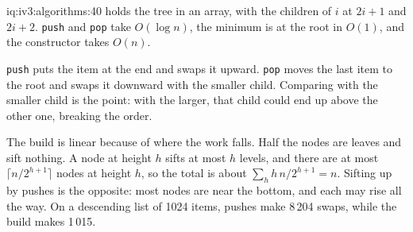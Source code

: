 \begin{solution}{iq:iv3:algorithms:40}
 holds the tree in an array, with the children of $i$ at $2i + 1$ and $2i + 2$. \texttt{push} and \texttt{pop} take $O(\log n)$, the minimum is at the root in $O(1)$, and the constructor takes $O(n)$.
\label{lst:iv3:al:heap}

\texttt{push} puts the item at the end and swaps it upward. \texttt{pop} moves the last item to the root and swaps it downward with the smaller child. Comparing with the smaller child is the point: with the larger, that child could end up above the other one, breaking the order.

The build is linear because of where the work falls. Half the nodes are leaves and sift nothing. A node at height $h$ sifts at most $h$ levels, and there are at most $\lceil n/2^{h+1} \rceil$ nodes at height $h$, so the total is about $\sum_h h\,n/2^{h+1} = n$. Sifting up by pushes is the opposite: most nodes are near the bottom, and each may rise all the way. On a descending list of 1024 items, pushes make 8\,204 swaps, while the build makes 1\,015.

\end{solution}

